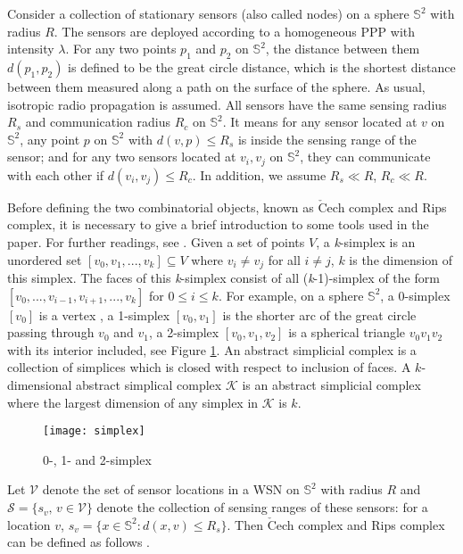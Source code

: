 \documentclass[journal, twoside]{IEEEtran}
\begin{document}
Consider a collection of stationary sensors (also called nodes)
on a sphere $\mathbb{S}^2$ with radius $R$. The sensors are deployed
according to a homogeneous PPP with intensity $\lambda$.
For any two points $p_1$ and $p_2$ on $\mathbb{S}^2$,
the distance between them $d(p_1, p_2)$ is defined to be the 
great circle distance, which is the shortest distance between  
them measured along a path on the surface of the sphere. 
As usual, isotropic radio propagation is assumed. All sensors 
have the same sensing radius $R_s$ and communication radius $R_c$
on $\mathbb{S}^2$. It means for any sensor located at $v$ on $\mathbb{S}^2$,
any point $p$ on $\mathbb{S}^2$ with $d(v,p) \leq R_s$ is inside the sensing range of the sensor;
and for any two sensors located at $v_i, v_j$ on $\mathbb{S}^2$, they can communicate
with each other if $d(v_i,v_j) \leq R_c$.  In addition, we assume
$R_s \ll R$, $R_c \ll R$.

Before defining the two combinatorial objects, known as 
$\check{\textrm{C}}$ech complex and Rips complex, 
it is necessary to give a brief introduction to some tools used
in the paper. For further readings, see \cite{ARM83, mun84, HAT02}.
Given a set of points $V$, a \textit{k}-simplex is an
unordered set $[v_0, v_1, ..., v_k] \subseteq V$ where $v_i \neq
v_j$ for all $i \neq j$, $k$ is the dimension of this simplex. The faces of this \textit{k}-simplex consist of
all (\textit{k}-1)-simplex of the form $[v_0, ..., v_{i-1},v_{i+1},
..., v_k]$ for $0 \leq i \leq k$. For example, on a sphere $\mathbb{S}^2$,
a 0-simplex $[v_0]$ is a vertex , a 1-simplex $[v_0,v_1]$ is the shorter arc
of the great circle passing through $v_0$ and $v_1$, a 2-simplex 
$[v_0, v_1, v_2]$ is a spherical triangle $v_0v_1v_2$ with its interior 
included, see Figure \ref{simplex}. An abstract simplicial complex is a collection of simplices which 
is closed with respect to inclusion of faces. A $k$-dimensional abstract simplical complex $\mathcal{K}$
is an abstract simplicial complex where the largest dimension of any simplex in $\mathcal{K}$ is $k$.

\begin{figure}[ht]
  \centering
  \texttt{[image: simplex]}
  \caption{0-, 1- and 2-simplex}
  \label{simplex}
\end{figure}

Let $\mathcal{V}$ denote the set of
sensor locations in a WSN on $\mathbb{S}^2$ with radius $R$ and $\mathcal{S}=\{s_v,\, v\in \mathcal{V}\}$  denote the collection of sensing
ranges of these sensors: for a location $v$,  $s_v = \{ x \in\mathbb{S}^2: d(x,v) \leq R_s\}$. 
Then $\check{\textrm{C}}$ech complex and Rips complex can be defined 
as follows \cite{DSG05,DSG07}.
\end{document}
